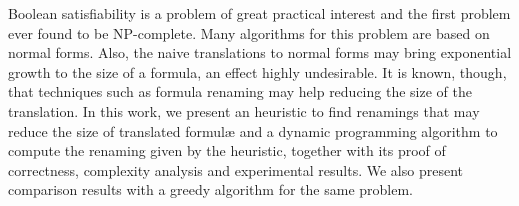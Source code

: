 Boolean satisfiability is a problem of great practical interest and the first problem ever found to be NP-complete. Many algorithms for this problem are based on normal forms. Also, the naive translations to normal forms may bring exponential growth to the size of a formula, an effect highly undesirable. It is known, though, that techniques such as formula renaming may help reducing the size of the translation. In this work, we present an heuristic to find renamings that may reduce the size of translated formul\ae \; and a dynamic programming algorithm to compute the renaming given by the heuristic, together with its proof of correctness, complexity analysis and experimental results. We also present comparison results with a greedy algorithm for the same problem.